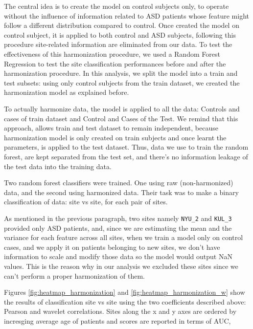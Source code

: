 \documentclass[11pt]{report}
\begin{document}
The central idea is to create the model on control subjects only, to operate without the influence of information related to ASD patients whose feature might follow a different distribution compared to control.
Once created the model on control subject, it is applied to both control and ASD subjects, following this procedure site-related information are eliminated from our data.
To test the effectiveness of this harmonization procedure, we used a Random Forest Regression to test the site classification performances before and after the harmonization procedure.
In this analysis, we split the model into a train and test subsets: using only control subjects from the train dataset, we created the harmonization model as explained before.

To actually harmonize data, the model is applied to all the data: Controls and cases of train dataset and Control and Cases of the Test.
We remind that this approach, allows train and test dataset to remain independent, because harmonization model is only created on train subjects and once learnt the parameters, is applied to the test dataset. Thus, data we use to train the random forest, are kept separated from the test set, and there's no information leakage of the test data into the training data.

Two random forest classifiers were trained. One using raw (non-harmonized) data, and the second using harmonized data.
Their task was to make a binary classification of data: site vs site, for each pair of sites.


\begin{notes}
\item As mentioned in the previous paragraph, two sites namely \texttt{NYU\_2} and \texttt{KUL\_3} provided only ASD patients, and, since we are estimating the mean and the variance for each feature across all sites, when we train a model only on control cases, and we apply it on patients belonging to new sites, we don't have information to scale and modify those data so the model would output NaN values.
This is the reason why in our analysis we excluded these sites since we can't perform a proper harmonization of them.
\end{notes}

Figures \ref{fig:heatmap_harmonization} and \ref{fig:heatmap_harmonization_w} show the results of classification site vs site using the two coefficients described above:  Pearson and wavelet correlations. Sites along the x and y axes are ordered by incresging average age of patients and scores are reported in terms of AUC,
\end{document}

